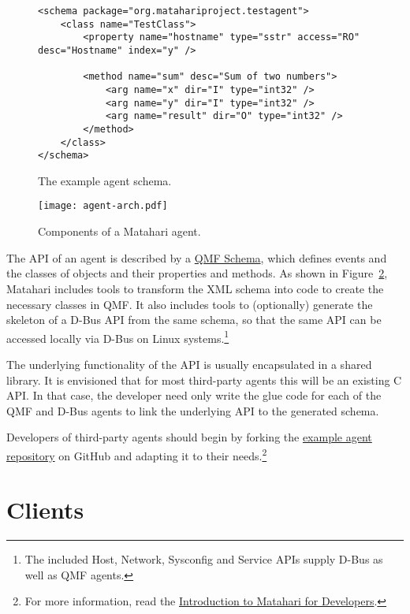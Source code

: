 \documentclass{tufte-handout}
\begin{document}
\begin{figure}[h]
\begin{Verbatim}
<schema package="org.matahariproject.testagent">
    <class name="TestClass">
        <property name="hostname" type="sstr" access="RO" desc="Hostname" index="y" />

        <method name="sum" desc="Sum of two numbers">
            <arg name="x" dir="I" type="int32" />
            <arg name="y" dir="I" type="int32" />
            <arg name="result" dir="O" type="int32" />
        </method>
    </class>
</schema>
\end{Verbatim}
\caption{The example agent schema.}
\label{fig:schema}
\end{figure}

\begin{figure}[hbt]
\texttt{[image: agent-arch.pdf]}
\caption{Components of a Matahari agent.}
\label{fig:agent-arch}
\end{figure}

The API of an agent is described by a \href{https://cwiki.apache.org/qpid/qpid-management-framework.html#QpidManagementFramework-Schema}{QMF Schema}, which defines events and the classes of objects and their properties and methods. As shown in Figure~\ref{fig:agent-arch}, Matahari includes tools to transform the XML schema into code to create the necessary classes in QMF.
It also includes tools to (optionally) generate the skeleton of a D-Bus API from the same schema, so that the same API can be accessed locally via D-Bus on Linux systems.\footnote{The included Host, Network, Sysconfig and Service APIs supply D-Bus as well as QMF agents.}

The underlying functionality of the API is usually encapsulated in a shared library. It is envisioned that for most third-party agents this will be an existing C API. In that case, the developer need only write the glue code for each of the QMF and D-Bus agents to link the underlying API to the generated schema.

Developers of third-party agents should begin by forking the \href{https://github.com/matahari/matahari-agent-example}{example agent repository} on GitHub and adapting it to their needs.\footnote{For more information, read the \href{https://github.com/downloads/zaneb/presentations/matahari-for-developers-7db27de.pdf}{Introduction to Matahari for Developers}.}

\section{Clients}
\end{document}
